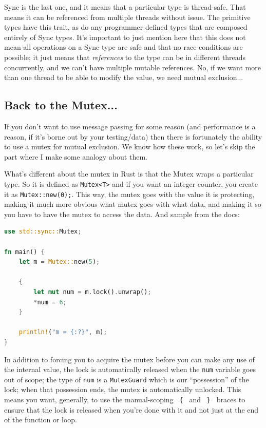 \documentclass[a4paper]{report}
\begin{document}
Sync is the last one, and it means that a particular type is thread-safe. That means it can be referenced from multiple threads without issue. The primitive types have this trait, as do any programmer-defined types that are composed entirely of Sync types. It's important to just mention here that this does not mean all operations on a Sync type are safe and that no race conditions are possible; it just means that \textit{references} to the type can be in different threads concurrently, and we can't have multiple mutable references. No, if we want more than one thread to be able to modify the value, we need mutual exclusion...

\subsection*{Back to the Mutex...}
If you don't want to use message passing for some reason (and performance is a reason, if it's borne out by your testing/data) then there is fortunately the ability to use a mutex for mutual exclusion. We know how these work, so let's skip the part where I make some analogy about them. 

What's different about the mutex in Rust is that the Mutex wraps a particular type. So it is defined as \texttt{Mutex<T>} and if you want an integer counter, you create it as \texttt{Mutex::new(0);}. This way, the mutex goes with the value it is protecting, making it much more obvious what mutex goes with what data, and making it so you have to have the mutex to access the data. And sample from the docs\cite{rustdocs}:

\begin{lstlisting}[language=Rust]
use std::sync::Mutex;

fn main() {
    let m = Mutex::new(5);

    {
        let mut num = m.lock().unwrap();
        *num = 6;
    }

    println!("m = {:?}", m);
}
\end{lstlisting}

In addition to forcing you to acquire the mutex before you can make any use of the internal value, the lock is automatically released when the \texttt{num} variable goes out of scope; the type of \texttt{num} is a \texttt{MutexGuard} which is our ``possession'' of the lock; when that possession ends, the mutex is automatically unlocked. This means you want, generally, to use the manual-scoping \texttt{ \{ } and \texttt{ \} } braces to ensure that the lock is released when you're done with it and not just at the end of the function or loop.
\end{document}
